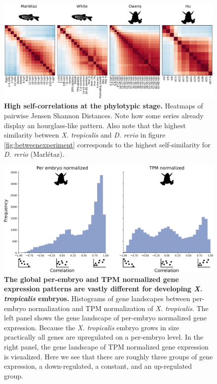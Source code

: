 \begin{figure}[H]
    \center
    \includegraphics[width=\linewidth]{ch.hourglass/images/within_experiment.png}
    \caption{\textbf{High self-correlations at the phylotypic stage.} Heatmaps of pairwise Jensen Shannon Distances. Note how some series already display an hourglass-like pattern. Also note that the highest similarity between \textit{X. tropicalis} and \textit{D. rerio} in figure \ref{fig:betweenexperiment} corresponds to the highest self-similarity for \textit{D. rerio} (Marl\'etaz).}
    \label{fig:withinexperiment}
\end{figure}

\begin{figure}[H]
    \center
    \includegraphics[width=0.75\linewidth]{ch.hourglass/images/gene_landscape_normalization.png}
    \caption{\textbf{The global per-embryo and TPM normalized gene expression patterns are vastly different for developing \textit{X. tropicalis} embryos.} Histograms of gene landscapes between per-embryo normalization and TPM normalization of \textit{X. tropicalis}. The left panel shows the gene landscape of per-embryo normalized gene expression. Because the \textit{X. tropicalis} embryo grows in size practically all genes are upregulated on a per-embryo level. In the right panel, the gene landscape of TPM normalized gene expression is visualized. Here we see that there are roughly three groups of gene expression, a down-regulated, a constant, and an up-regulated group.}
    \label{fig:genelandscapenormalization}
\end{figure}

